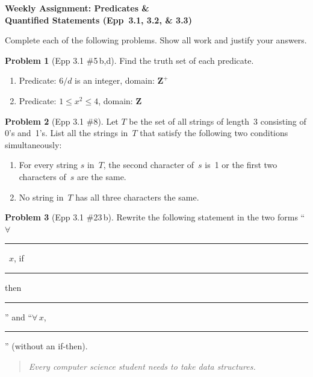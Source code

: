 \documentclass[11pt]{article}
\begin{document}
\begin{center}
  {\Large\bfseries Weekly Assignment: Predicates \&\\[2pt]
   Quantified Statements (Epp~3.1, 3.2, \& 3.3)}
\end{center}

\bigskip

\noindent
Complete each of the following problems.  Show all work and justify your answers.

\bigskip

\noindent\textbf{Problem 1} (Epp 3.1 \#5\,b,d). \;
Find the truth set of each predicate.

\begin{enumerate}[label=\textbf{\alph*.},start=2,itemsep=4pt]
  \item Predicate: $6/d$ is an integer, \quad domain: $\mathbf{Z}^+$
  \setcounter{enumi}{3}
  \item Predicate: $1 \le x^2 \le 4$, \quad domain: $\mathbf{Z}$
\end{enumerate}

\bigskip

\noindent\textbf{Problem 2} (Epp 3.1 \#8). \;
Let $T$ be the set of all strings of length~3 consisting of 0's
and~1's.  List all the strings in~$T$ that satisfy the following
two conditions simultaneously:

\begin{enumerate}[label=\arabic*.,itemsep=4pt]
  \item For every string $s$ in~$T$, the second character
        of~$s$ is~1 or the first two characters of~$s$ are the
        same.
  \item No string in~$T$ has all three characters the same.
\end{enumerate}

\bigskip

\noindent\textbf{Problem 3} (Epp 3.1 \#23\,b). \;
Rewrite the following statement in the two forms
``$\forall$~\rule{1cm}{0.4pt}~$x$, if \rule{1cm}{0.4pt}
then \rule{1cm}{0.4pt}'' \;and\;
``$\forall\, x$, \rule{1cm}{0.4pt}''
(without an if-then).

\begin{quote}
  \emph{Every computer science student needs to take data structures.}
\end{quote}

\bigskip
\end{document}
